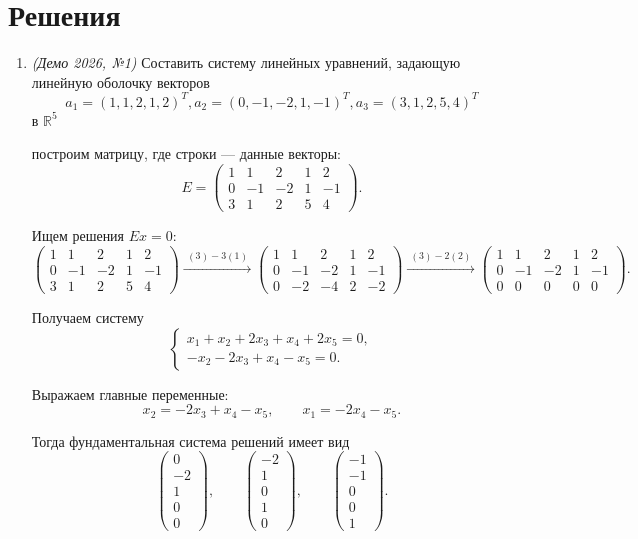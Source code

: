 \section*{Решения}

\begin{enumerate}
\item \textit{(Демо 2026, №1)} Составить систему линейных уравнений, задающую линейную оболочку векторов
\[
a_1 = (1, 1, 2, 1, 2)^T, a_2 = (0, -1, -2, 1, -1)^T, a_3 = (3, 1, 2, 5, 4)^T
\]
в $\mathbb{R}^5$

построим матрицу, где строки — данные векторы:
\[
E =
\begin{pmatrix}
    1 & 1 & 2 & 1 & 2 \\
    0 & -1 & -2 & 1 & -1 \\
    3 & 1 & 2 & 5 & 4
\end{pmatrix}.
\]

Ищем решения $Ex=0$:
\[
\begin{pmatrix}
    1 & 1 & 2 & 1 & 2 \\
    0 & -1 & -2 & 1 & -1 \\
    3 & 1 & 2 & 5 & 4
\end{pmatrix}
\xrightarrow{\,\, (3)-3(1) \,\,}
\begin{pmatrix}
    1 & 1 & 2 & 1 & 2 \\
    0 & -1 & -2 & 1 & -1 \\
    0 & -2 & -4 & 2 & -2
\end{pmatrix}
\xrightarrow{\,\, (3)-2(2) \,\,}
\begin{pmatrix}
    1 & 1 & 2 & 1 & 2 \\
    0 & -1 & -2 & 1 & -1 \\
    0 & 0 & 0 & 0 & 0
\end{pmatrix}.
\]

Получаем систему
\[
\begin{cases}
    x_1 + x_2 + 2x_3 + x_4 + 2x_5 = 0,\\
    -x_2 - 2x_3 + x_4 - x_5 = 0.
\end{cases}
\]

Выражаем главные переменные:
\[
x_2 = -2x_3 + x_4 - x_5,
\qquad
x_1 = -2x_4 - x_5.
\]

Тогда фундаментальная система решений имеет вид
\[
\begin{pmatrix}
    0\\-2\\1\\0\\0
\end{pmatrix},
\qquad
\begin{pmatrix}
    -2\\1\\0\\1\\0
\end{pmatrix},
\qquad
\begin{pmatrix}
    -1\\-1\\0\\0\\1
\end{pmatrix}.
\]


\end{enumerate}
